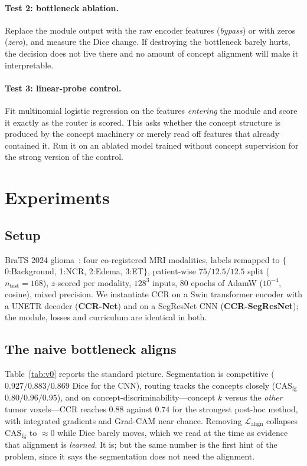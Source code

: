 \documentclass[runningheads]{llncs}
\newcommand{\casfg}{\mathrm{CAS}_{\mathrm{fg}}}
\begin{document}
\paragraph{Test 2: bottleneck ablation.} Replace the module output with the raw encoder
features (\emph{bypass}) or with zeros (\emph{zero}), and measure the Dice change. If
destroying the bottleneck barely hurts, the decision does not live there and no amount of
concept alignment will make it interpretable.

\paragraph{Test 3: linear-probe control.} Fit multinomial logistic regression on the features
\emph{entering} the module and score it exactly as the router is scored. This asks whether the
concept structure is produced by the concept machinery or merely read off features that already
contained it. Run it on an ablated model trained without concept supervision for the strong
version of the control.

\section{Experiments}\label{sec:experiments}
\subsection{Setup}
BraTS 2024 glioma~\cite{menze2014brats,baid2021brats}: four co-registered MRI modalities,
labels remapped to $\{$0:Background, 1:NCR, 2:Edema, 3:ET$\}$, patient-wise
$75/12.5/12.5$ split ($n_{\text{test}}{=}168$), $z$-scored per modality, $128^3$ inputs,
$80$ epochs of AdamW ($10^{-4}$, cosine), mixed precision. We instantiate CCR on a Swin
transformer encoder with a UNETR decoder (\textbf{CCR-Net}) and on a SegResNet CNN
(\textbf{CCR-SegResNet}); the module, losses and curriculum are identical in both.

\subsection{The naive bottleneck aligns}\label{sec:aligns}
Table~\ref{tab:v0} reports the standard picture. Segmentation is competitive
($0.927/0.883/0.869$ Dice for the CNN), routing tracks the concepts closely
($\casfg$ $0.80/0.96/0.95$), and on concept-discriminability---concept $k$ versus the
\emph{other} tumor voxels---CCR reaches $0.88$ against $0.74$ for the strongest post-hoc
method, with integrated gradients and Grad-CAM near chance. Removing
$\mathcal{L}_{\text{align}}$ collapses $\casfg$ to $\approx0$ while Dice barely moves,
which we read at the time as evidence that alignment is \emph{learned}. It is; but the same
number is the first hint of the problem, since it says the segmentation does not need the
alignment.
\end{document}
